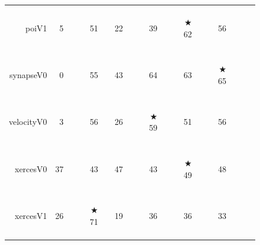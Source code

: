 \documentclass{sig-alternative}
\newcommand{\crule}[3][darkgray]{\textcolor{#1}{\rule{#2}{#3}}}
\newcommand{\rone}{\crule{1mm}{1.95mm}}
\newcommand{\rtwo}{\crule{1mm}{1.95mm}\hspace{0.3pt}\crule{1mm}{1.95mm}}
\newcommand{\rthree}{\crule{1mm}{1.95mm}\hspace{0.3pt}\crule{1mm}{1.95mm}\hspace{0.3pt}\crule{1mm}{1.95mm}}
\newcommand{\rfour}{\crule{1mm}{1.95mm}\hspace{0.3pt}\crule{1mm}{1.95mm}\hspace{0.3pt}\crule{1mm}{1.95mm}\hspace{0.3pt}\crule{1mm}{1.95mm}}
\begin{document}
\begin{figure}
\begin{minipage}{0.81\linewidth}
\begin{tabular}{r@{~}|r@{~}l@{~}|r@{~}l@{~}|r@{~}l|r@{~}@{~}l|r@{~}l@{~}|r@{~}l@{~}|r@{~}l}
poiV1 & 5 &         & 51 & {\rfour} & 22 & {\rone} & 39 & {\rtwo} &$\bigstar$ 62 & {\rfour} & 56 & {\rfour}\\
synapseV0 & 0 &         & 55 & {\rfour} & 43 & {\rthree} & 64 & {\rfour} & 63 & {\rfour} &$\bigstar$ 65 & {\rfour}\\
velocityV0 & 3 &         & 56 & {\rfour} & 26 & {\rtwo} &$\bigstar$ 59 & {\rfour} & 51 & {\rfour} & 56 & {\rfour}\\
xercesV0 & 37 &         & 43 & {\rtwo} & 47 & {\rfour} & 43 & {\rtwo} &$\bigstar$ 49 & {\rfour} & 48 & {\rfour}\\
xercesV1 & 26 &         &$\bigstar$ 71 & {\rfour} & 19 &         & 36 & {\rone} & 36 & {\rone} & 33 & {\rone}\\
\end{tabular}
\end{minipage}\begin{minipage}{.15\linewidth}
\begin{tabular}{|p{\linewidth}|}\hline


\end{tabular}
\end{minipage}
\end{figure}
\end{document}
